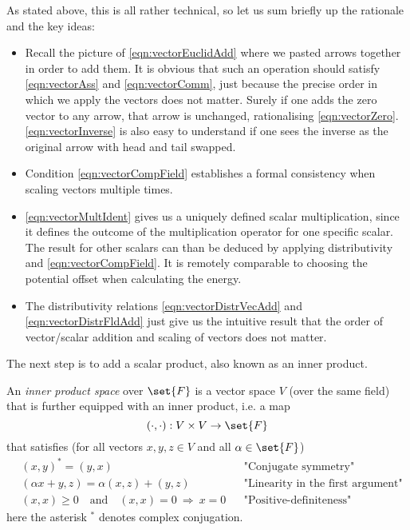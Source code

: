 \begin{nte}
	As stated above, this is all rather technical, so let us sum briefly up the rationale and the key ideas:
	\begin{itemize}
		\item Recall the picture of \eqref{eqn:vectorEuclidAdd} where we pasted arrows together in order to add them. 
			It is obvious that such an operation should satisfy \eqref{eqn:vectorAss} and \eqref{eqn:vectorComm}, just because the precise order in which we apply the vectors does not matter.
			Surely if one adds the zero vector to any arrow, that arrow is unchanged, rationalising \eqref{eqn:vectorZero}.
			\eqref{eqn:vectorInverse} is also easy to understand if one sees the inverse as the original arrow with head and tail swapped.
		\item Condition \eqref{eqn:vectorCompField} establishes a formal consistency when scaling vectors multiple times.
		\item \eqref{eqn:vectorMultIdent} gives us a uniquely defined scalar multiplication, since it defines the outcome of the multiplication operator for one specific scalar.
			The result for other scalars can than be deduced by applying distributivity and \eqref{eqn:vectorCompField}. 
			It is remotely comparable to choosing the potential offset when calculating the energy.
		\item The distributivity relations \eqref{eqn:vectorDistrVecAdd} and \eqref{eqn:vectorDistrFldAdd} just give us the intuitive result that the order of vector/scalar addition and scaling of vectors does not matter.
	\end{itemize}
\end{nte}

\noindent
The next step is to add a scalar product, also known as an inner product.
\begin{defn}
	An \emph{inner product space} over $\set{F}$ is a vector space $V$ (over the same field) that is further equipped with an inner product, i.e. a map
	\[ (\cdot,\cdot) : V \times V \to \set{F} \]
	that satisfies (for all vectors $x,y,z \in V$ and all $\alpha \in \set{F}$)
	\begin{align}
		\label{eqn:innProdConjSym}  &(x,y)^\ast = (y,x) &&                                                 \text{"Conjugate symmetry"} \\
		\label{eqn:innProdLinLeft}  &(\alpha x + y,z) = \alpha (x,z) + (y,z) &&                            \text{"Linearity in the first argument"} \\
		\label{eqn:innProdPosDef}   &(x,x) \ge 0 \quad \text{and} \quad (x,x) = 0 ~\Rightarrow~ x = 0  &&  \text{"Positive-definiteness"}
	\end{align}
	here the asterisk $^\ast$ denotes complex conjugation.
\end{defn}

